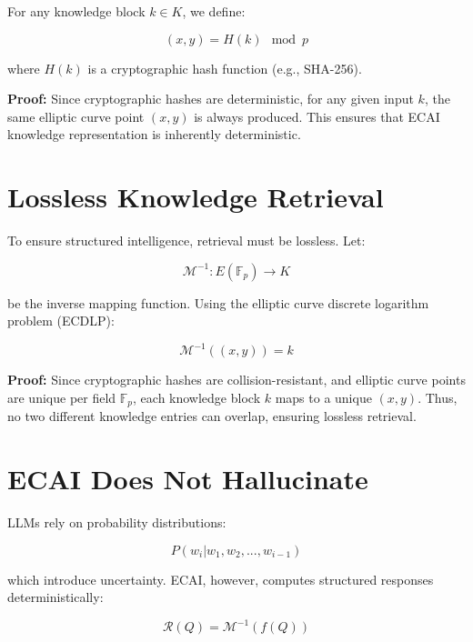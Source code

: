 \documentclass{article}
\begin{document}
For any knowledge block $k \in K$, we define:

\begin{equation}
(x, y) = H(k) \mod p
\end{equation}

where $H(k)$ is a cryptographic hash function (e.g., SHA-256).

\textbf{Proof:} Since cryptographic hashes are deterministic, for any given input $k$, the same elliptic curve point $(x, y)$ is always produced. This ensures that ECAI knowledge representation is inherently deterministic.

\section{Lossless Knowledge Retrieval}

To ensure structured intelligence, retrieval must be lossless. Let:

\begin{equation}
\mathcal{M}^{-1}: E(\mathbb{F}_p) \to K
\end{equation}

be the inverse mapping function. Using the elliptic curve discrete logarithm problem (ECDLP):

\begin{equation}
\mathcal{M}^{-1}((x, y)) = k
\end{equation}

\textbf{Proof:} Since cryptographic hashes are collision-resistant, and elliptic curve points are unique per field $\mathbb{F}_p$, each knowledge block $k$ maps to a unique $(x, y)$. Thus, no two different knowledge entries can overlap, ensuring lossless retrieval.

\section{ECAI Does Not Hallucinate}

LLMs rely on probability distributions:

\begin{equation}
P(w_i | w_1, w_2, ..., w_{i-1})
\end{equation}

which introduce uncertainty. ECAI, however, computes structured responses deterministically:

\begin{equation}
\mathcal{R}(Q) = \mathcal{M}^{-1} \left( f(Q) \right)
\end{equation}
\end{document}
